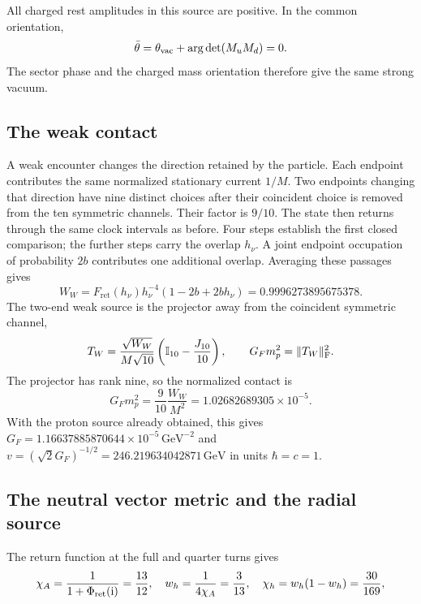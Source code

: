 \documentclass[aps,prx,onecolumn,10pt,notitlepage,nofootinbib,longbibliography]{revtex4-2}
\numberwithin{equation}{section}
\numberwithin{table}{section}
\newcommand{\Id}{\mathbb I}
\newcommand{\ii}{\mathrm i}
\newcommand{\GeV}{\,\mathrm{GeV}}
\newcommand{\Fret}{F_{\mathrm{ret}}}
\newcommand{\hover}{h_\nu}
\newcommand{\Phis}{\Phi_{\rm ret}}
\begin{document}
All charged rest amplitudes in this source are positive. In the common orientation,
\begin{equation}
 \bar\theta=\theta_{\rm vac}+\arg\det(M_uM_d)=0.
 \label{eq:chargedvacuumorientation}
\end{equation}
The sector phase and the charged mass orientation therefore give the same strong vacuum.

\subsection{The weak contact}
A weak encounter changes the direction retained by the particle. Each endpoint contributes the same normalized stationary current $1/M$. Two endpoints changing that direction have nine distinct choices after their coincident choice is removed from the ten symmetric channels. Their factor is $9/10$. The state then returns through the same clock intervals as before. Four steps establish the first closed comparison; the further steps carry the overlap $\hover$. A joint endpoint occupation of probability $2b$ contributes one additional overlap. Averaging these passages gives
\begin{equation}
 W_W=\Fret(\hover)\hover^{-4}(1-2b+2b\hover)=0.9996273895675378.
\end{equation}
The two-end weak source is the projector away from the coincident symmetric channel,
\begin{equation}
 T_W=\frac{\sqrt{W_W}}{M\sqrt{10}}\left(\Id_{10}-\frac{J_{10}}{10}\right),
 \qquad G_Fm_p^2=\|T_W\|_{\rm F}^2.
 \label{eq:weakcontactmatrix}
\end{equation}
The projector has rank nine, so the normalized contact is
\begin{equation}
 G_Fm_p^2=\frac9{10}\frac{W_W}{M^2}
 =1.02682689305\times10^{-5}.
 \label{eq:GF}
\end{equation}
With the proton source already obtained, this gives $G_F=1.16637885870644\times10^{-5}\GeV^{-2}$ and $v=(\sqrt2G_F)^{-1/2}=246.219634042871\GeV$ in units $\hbar=c=1$.

\subsection{The neutral vector metric and the radial source}
The return function at the full and quarter turns gives
\begin{equation}
 \chi_A=\frac1{1+\Phis(\ii)}=\frac{13}{12},\quad
 w_h=\frac1{4\chi_A}=\frac3{13},\quad
 \chi_h=w_h(1-w_h)=\frac{30}{169},
\end{equation}
\end{document}
